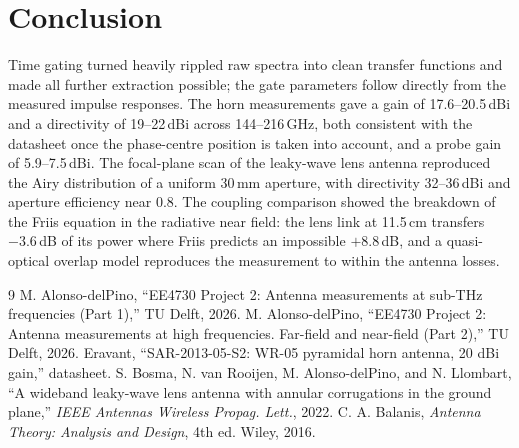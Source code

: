 \documentclass[conference]{IEEEtran}
\begin{document}
\section{Conclusion}
Time gating turned heavily rippled raw spectra into clean transfer functions and made all further extraction possible; the gate parameters follow directly from the measured impulse responses. The horn measurements gave a gain of 17.6--20.5\,dBi and a directivity of 19--22\,dBi across 144--216\,GHz, both consistent with the datasheet once the phase-centre position is taken into account, and a probe gain of 5.9--7.5\,dBi. The focal-plane scan of the leaky-wave lens antenna reproduced the Airy distribution of a uniform 30\,mm aperture, with directivity 32--36\,dBi and aperture efficiency near 0.8. The coupling comparison showed the breakdown of the Friis equation in the radiative near field: the lens link at 11.5\,cm transfers $-3.6$\,dB of its power where Friis predicts an impossible $+8.8$\,dB, and a quasi-optical overlap model reproduces the measurement to within the antenna losses.

\begin{thebibliography}{9}
 M. Alonso-delPino, ``EE4730 Project 2: Antenna measurements at sub-THz frequencies (Part 1),'' TU Delft, 2026.
 M. Alonso-delPino, ``EE4730 Project 2: Antenna measurements at high frequencies. Far-field and near-field (Part 2),'' TU Delft, 2026.
 Eravant, ``SAR-2013-05-S2: WR-05 pyramidal horn antenna, 20 dBi gain,'' datasheet.
 S. Bosma, N. van Rooijen, M. Alonso-delPino, and N. Llombart, ``A wideband leaky-wave lens antenna with annular corrugations in the ground plane,'' \emph{IEEE Antennas Wireless Propag. Lett.}, 2022.
 C. A. Balanis, \emph{Antenna Theory: Analysis and Design}, 4th ed. Wiley, 2016.
\end{thebibliography}
\end{document}
